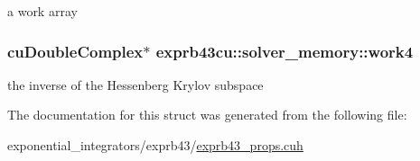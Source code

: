 a work array 

\subsubsection[{\texorpdfstring{work4}{work4}}]{\setlength{\rightskip}{0pt plus 5cm}cu\+Double\+Complex$\ast$ exprb43cu\+::solver\+\_\+memory\+::work4}\hypertarget{structexprb43cu_1_1solver__memory_a7db0969d6909faa9beb4965290c52a63}{}\label{structexprb43cu_1_1solver__memory_a7db0969d6909faa9beb4965290c52a63}


the inverse of the Hessenberg Krylov subspace 



The documentation for this struct was generated from the following file\+:\begin{DoxyCompactItemize}
\item 
exponential\+\_\+integrators/exprb43/\hyperlink{exprb43__props_8cuh}{exprb43\+\_\+props.\+cuh}\end{DoxyCompactItemize}
